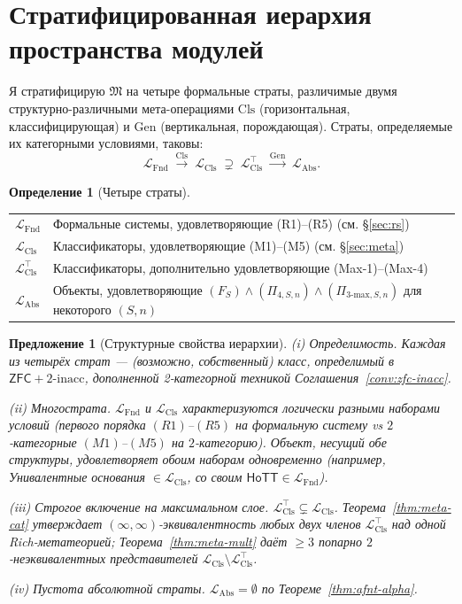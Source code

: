 \documentclass[11pt]{article}
\theoremstyle{plain}
\newtheorem{proposition}[theorem]{Предложение}
\theoremstyle{definition}
\newtheorem{definition}[theorem]{Определение}
\newcommand{\fM}{\mathfrak{M}}
\newcommand{\LFnd}{\mathcal{L}_{\mathrm{Fnd}}}
\newcommand{\LCls}{\mathcal{L}_{\mathrm{Cls}}}
\newcommand{\LClsMax}{\mathcal{L}_{\mathrm{Cls}}^{\top}}
\newcommand{\LAbs}{\mathcal{L}_{\mathrm{Abs}}}
\newcommand{\ZFC}{\mathsf{ZFC}}
\newcommand{\HoTT}{\mathsf{HoTT}}
\begin{document}
\section{Стратифицированная иерархия пространства модулей}\label{sec:hierarchy}

Я стратифицирую $\fM$ на четыре формальные страты, различимые двумя структурно-различными мета-операциями $\mathrm{Cls}$ (горизонтальная, классифицирующая) и $\mathrm{Gen}$ (вертикальная, порождающая). Страты, определяемые их категорными условиями, таковы:
\[
\LFnd \;\xrightarrow{\mathrm{Cls}}\; \LCls \;\supsetneq\; \LClsMax \;\xrightarrow{\mathrm{Gen}}\; \LAbs.
\]

\begin{definition}[Четыре страты]
\begin{tabular}{@{}ll@{}}
\toprule
$\LFnd$ & Формальные системы, удовлетворяющие (R1)--(R5) (см. \S\ref{sec:rs}) \\
$\LCls$ & Классификаторы, удовлетворяющие (M1)--(M5) (см. \S\ref{sec:meta}) \\
$\LClsMax$ & Классификаторы, дополнительно удовлетворяющие (Max-1)--(Max-4) \\
$\LAbs$ & Объекты, удовлетворяющие $(F_S) \wedge (\Pi_{4, S, n}) \wedge (\Pi_{3\text{-max}, S, n})$ для некоторого $(S, n)$ \\
\bottomrule
\end{tabular}
\end{definition}

\begin{proposition}[Структурные свойства иерархии]\label{prop:level-structure}
(i) \emph{Определимость.} Каждая из четырёх страт — (возможно, собственный) класс, определимый в $\ZFC + 2\text{-inacc}$, дополненной 2-категорной техникой Соглашения~\ref{conv:zfc-inacc}.

(ii) \emph{Многострата.} $\LFnd$ и $\LCls$ характеризуются логически разными наборами условий (первого порядка $(R1)$--$(R5)$ на формальную систему vs $2$-категорные $(M1)$--$(M5)$ на $2$-категорию). Объект, несущий обе структуры, удовлетворяет обоим наборам одновременно (например, Унивалентные основания $\in \LCls$, со своим $\HoTT \in \LFnd$).

(iii) \emph{Строгое включение на максимальном слое.} $\LClsMax \subsetneq \LCls$. Теорема~\ref{thm:meta-cat} утверждает $(\infty,\infty)$-эквивалентность любых двух членов $\LClsMax$ над одной Rich-метатеорией; Теорема~\ref{thm:meta-mult} даёт $\geq 3$ попарно $2$-неэквивалентных представителей $\LCls \setminus \LClsMax$.

(iv) \emph{Пустота абсолютной страты.} $\LAbs = \emptyset$ по Теореме~\ref{thm:afnt-alpha}.
\end{proposition}
\end{document}
